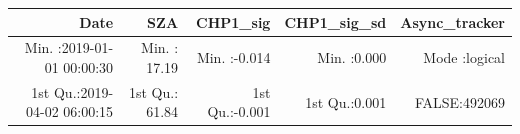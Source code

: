 \documentclass[
  10pt,
  a4paper,oneside]{article}
\begin{document}
\begin{longtable}[]{@{}rrrrr@{}}
\toprule
\begin{minipage}[b]{0.27\columnwidth}\raggedleft
Date\strut
\end{minipage} & \begin{minipage}[b]{0.15\columnwidth}\raggedleft
SZA\strut
\end{minipage} & \begin{minipage}[b]{0.15\columnwidth}\raggedleft
CHP1\_sig\strut
\end{minipage} & \begin{minipage}[b]{0.14\columnwidth}\raggedleft
CHP1\_sig\_sd\strut
\end{minipage} & \begin{minipage}[b]{0.14\columnwidth}\raggedleft
Async\_tracker\strut
\end{minipage}\tabularnewline
\midrule
\endhead
\begin{minipage}[t]{0.27\columnwidth}\raggedleft
Min. :2019-01-01 00:00:30\strut
\end{minipage} & \begin{minipage}[t]{0.15\columnwidth}\raggedleft
Min. : 17.19\strut
\end{minipage} & \begin{minipage}[t]{0.15\columnwidth}\raggedleft
Min. :-0.014\strut
\end{minipage} & \begin{minipage}[t]{0.14\columnwidth}\raggedleft
Min. :0.000\strut
\end{minipage} & \begin{minipage}[t]{0.14\columnwidth}\raggedleft
Mode :logical\strut
\end{minipage}\tabularnewline
\begin{minipage}[t]{0.27\columnwidth}\raggedleft
1st Qu.:2019-04-02 06:00:15\strut
\end{minipage} & \begin{minipage}[t]{0.15\columnwidth}\raggedleft
1st Qu.: 61.84\strut
\end{minipage} & \begin{minipage}[t]{0.15\columnwidth}\raggedleft
1st Qu.:-0.001\strut
\end{minipage} & \begin{minipage}[t]{0.14\columnwidth}\raggedleft
1st Qu.:0.001\strut
\end{minipage} & \begin{minipage}[t]{0.14\columnwidth}\raggedleft
FALSE:492069\strut
\end{minipage}\tabularnewline

\end{longtable}
\end{document}
